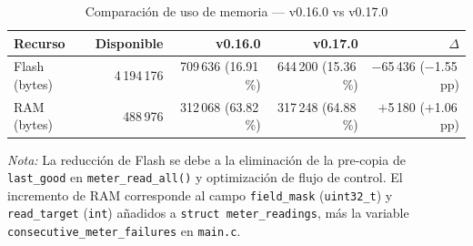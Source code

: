 
\begin{table}[htbp]
\centering
\caption{Comparación de uso de memoria — v0.16.0 vs v0.17.0}
\label{tab:memory-v017}
\begin{tabular}{l r r r r}
\toprule
\textbf{Recurso} & \textbf{Disponible} & \textbf{v0.16.0} & \textbf{v0.17.0} & \textbf{$\Delta$} \\
\midrule
Flash (bytes) & 4\,194\,176 & 709\,636 (16.91\,\%) & 644\,200 (15.36\,\%) & $-$65\,436 ($-$1.55\,pp) \\
RAM   (bytes) & 488\,976   & 312\,068 (63.82\,\%) & 317\,248 (64.88\,\%) & $+$5\,180 ($+$1.06\,pp) \\
\bottomrule
\end{tabular}

\smallskip
\footnotesize
\textit{Nota:} La reducción de Flash se debe a la eliminación de la pre-copia de
\texttt{last\_good} en \texttt{meter\_read\_all()} y optimización de flujo de control.
El incremento de RAM corresponde al campo \texttt{field\_mask} (\texttt{uint32\_t}) y
\texttt{read\_target} (\texttt{int}) añadidos a \texttt{struct meter\_readings}, más
la variable \texttt{consecutive\_meter\_failures} en \texttt{main.c}.
\end{table}
